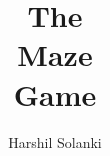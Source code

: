 \documentclass{article}
\begin{document}
\title{
The\\
Maze\\
Game
}
\author{Harshil Solanki}
\date{}
\maketitle
\tableofcontents
\clearpage
\end{document}
